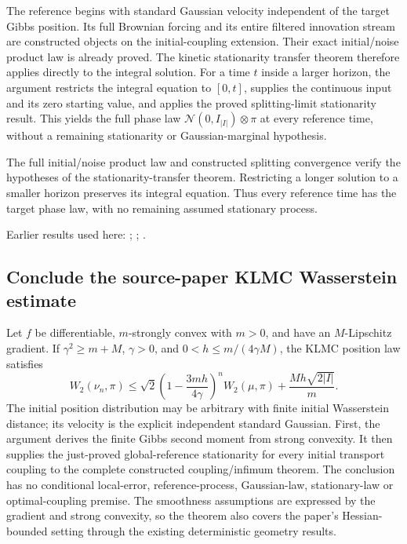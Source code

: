 \documentclass[11pt,a4paper]{report}
\begin{document}
The reference begins with standard Gaussian velocity independent of the target Gibbs position. Its full Brownian forcing and its entire filtered innovation stream are constructed objects on the initial-coupling extension. Their exact initial/\allowbreak{}noise product law is already proved. The kinetic stationarity transfer theorem therefore applies directly to the integral solution. For a time \(t\) inside a larger horizon, the argument restricts the integral equation to \([0,t]\), supplies the continuous input and its zero starting value, and applies the proved splitting-limit stationarity result. This yields the full phase law \(\mathcal N(0,I_{|I|})\otimes\pi\) at every reference time, without a remaining stationarity or Gaussian-marginal hypothesis.



The full initial/\allowbreak{}noise product law and constructed splitting convergence verify the hypotheses of the stationarity-transfer theorem. Restricting a longer solution to a smaller horizon preserves its integral equation. Thus every reference time has the target phase law, with no remaining assumed stationary process.



Earlier results used here: \cite[Section~3.13.2]{LangevinLean2026ULASC}; \cite[Section~3.17.1]{LangevinLean2026ULASC}; \cite[Section~3.26.3]{LangevinLean2026ULASC}.
\subsection{\texorpdfstring{Conclude the source-paper KLMC Wasserstein estimate}{Conclude the source-paper KLMC Wasserstein estimate}}
\label{report-step-KineticLangevin-GenericCanonicalKLMC-lean-19}


Let \(f\) be differentiable, \(m\)-strongly convex with \(m>0\), and have an \(M\)-Lipschitz gradient. If \(\gamma^2\ge m+M\), \(\gamma>0\), and \(0<h\le m/(4\gamma M)\), the KLMC position law satisfies \[W_2(\nu_n,\pi)\le\sqrt2\left(1-\frac{3mh}{4\gamma}\right)^nW_2(\mu,\pi)+\frac{Mh\sqrt{2|I|}}m.\] The initial position distribution may be arbitrary with finite initial Wasserstein distance; its velocity is the explicit independent standard Gaussian. First, the argument derives the finite Gibbs second moment from strong convexity. It then supplies the just-proved global-reference stationarity for every initial transport coupling to the complete constructed coupling/\allowbreak{}infimum theorem. The conclusion has no conditional local-error, reference-process, Gaussian-law, stationary-law or optimal-coupling premise. The smoothness assumptions are expressed by the gradient and strong convexity, so the theorem also covers the paper's Hessian-bounded setting through the existing deterministic geometry results.
\end{document}
